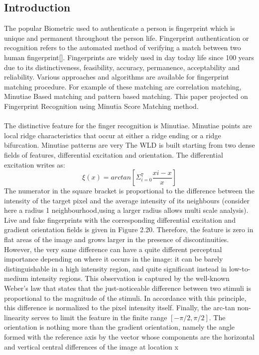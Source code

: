  \subsection{Introduction}
 The popular Biometric  used to authenticate  a person  is  fingerprint which is unique and permanent throughout the person life. Fingerprint authentication or recognition refers to the automated method of verifying a match between two human fingerprint[]. Fingerprints are widely used in day today life since 100 years due to its distinctiveness, feasibility, accuracy, permanence,  acceptability and reliability. Various approaches and algorithms are available for fingerprint matching procedure. For example of these matching are correlation matching, Minutiae Based matching and pattern based matching. This paper  projected on Fingerprint Recognition using Minutia Score Matching method. 
\paragraph{}
The distinctive feature for the finger recognition is Minutiae. Minutiae points are local ridge characteristics that occur at either a ridge ending or a ridge bifurcation. Minutiae patterns are very 
The WLD is built starting from two dense fields of features, differential excitation and orientation. The differential excitation writes as: 
\begin{equation}
\xi(x)=arctan [\Sigma _{i=0}^{7} \frac{xi-x}{x}]  
\end{equation}
The numerator in the square bracket is proportional to the difference between the intensity of the target pixel and the average intensity of its neighbours (consider here a radius 1 neighbourhood,using a larger radius allows multi scale analysis). Live and fake fingerprints with the corresponding differential excitation and gradient orientation fields is given in Figure 2.20. Therefore, the feature is zero in flat areas of the image and grows larger in the presence of discontinuities. However, the very same difference can have a quite different perceptual importance depending on where it occurs in the image: it can be barely distinguishable in a high intensity region, and quite significant instead in low-to-medium intensity regions. This observation is captured by the well-known Weber’s law that states that the just-noticeable difference between two stimuli is proportional to the magnitude of the stimuli. In accordance with this principle, this difference is normalized to the pixel intensity itself. Finally, the arc-tan non-linearity serves to limit the feature in the finite range $[-\pi /2,\pi/2]$. The orientation is nothing more than the gradient orientation, namely the angle formed with the reference axis by the vector whose components are the horizontal and vertical central differences of the image at location x 


